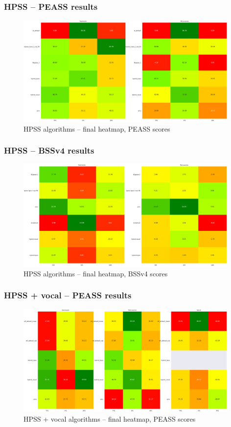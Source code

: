 \documentclass{beamer}
\begin{document}

\begin{frame}
	\frametitle{HPSS -- PEASS results}
	\begin{figure}[ht]
		\includegraphics[width=11cm]{../evaluation/heatmaps/Final_HPSS_PEASS_abbrev.png}
		\caption{HPSS algorithms -- final heatmap, PEASS scores}
	\end{figure}
\end{frame}

\begin{frame}
	\frametitle{HPSS -- BSSv4 results}
	\begin{figure}[ht]
		\includegraphics[width=11cm]{../evaluation/heatmaps/Final_HPSS_BSSv4_abbrev.png}
		\caption{HPSS algorithms -- final heatmap, BSSv4 scores}
	\end{figure}
\end{frame}

\begin{frame}
	\frametitle{HPSS + vocal -- PEASS results}
	\begin{figure}[ht]
		\includegraphics[width=11cm]{../evaluation/heatmaps/Final_Vocal_PEASS_abbrev.png}
		\caption{HPSS + vocal algorithms -- final heatmap, PEASS scores}
	\end{figure}
\end{frame}
\end{document}
